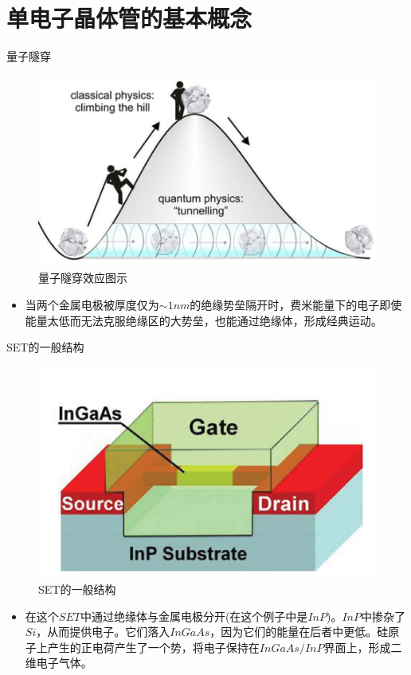 \documentclass{beamer}[fontset=windows]
\begin{document}
	\section{单电子晶体管的基本概念}
    \begin{frame}
    \begin{block}{量子隧穿}
    	\begin{figure}[H]
    		\centering
    		\hspace{2em}\includegraphics[width=.6\linewidth]{pic/1.png}
    		\caption{量子隧穿效应图示
    		}
    	\end{figure}
        \begin{itemize}
        \item 当两个金属电极被厚度仅为$\sim 1nm$的绝缘势垒隔开时，费米能量下的电子即使能量太低而无法克服绝缘区的大势垒，也能通过绝缘体，形成经典运动。
        \end{itemize}
    \end{block}
    \end{frame}
    \begin{frame}
        \begin{block}{SET的一般结构}
            	\begin{figure}[H]
            		\centering
            		\hspace{2em}\includegraphics[width=.5\linewidth]{pic/3.png}
            		\caption{SET的一般结构\cite{mandal2013single}
            		}
            	\end{figure}
        \begin{itemize}
                 \item\small{ 在这个$SET$中通过绝缘体与金属电极分开(在这个例子中是$InP$)。$InP$中掺杂了$Si$，从而提供电子。它们落入$InGaAs$，因为它们的能量在后者中更低。硅原子上产生的正电荷产生了一个势，将电子保持在$InGaAs/InP$界面上，形成二维电子气体。}
                 \end{itemize}
        \end{block}
        \end{frame}
\end{document}
